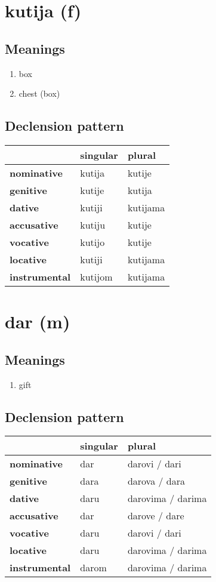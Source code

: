 \filbreak
\section{kutija (f)}
\subsection*{Meanings}
\begin{enumerate}
\item box
\item chest (box)
\end{enumerate}
\subsection*{Declension pattern}
\begin{tabularx}{\linewidth}{Xll}
\toprule
{} & singular &    plural \\
\midrule
\textbf{nominative  } &   kutija &    kutije \\
\textbf{genitive    } &   kutije &    kutija \\
\textbf{dative      } &   kutiji &  kutijama \\
\textbf{accusative  } &   kutiju &    kutije \\
\textbf{vocative    } &   kutijo &    kutije \\
\textbf{locative    } &   kutiji &  kutijama \\
\textbf{instrumental} &  kutijom &  kutijama \\
\bottomrule
\end{tabularx}

\filbreak
\section{dar (m)}
\subsection*{Meanings}
\begin{enumerate}
\item gift
\end{enumerate}
\subsection*{Declension pattern}
\begin{tabularx}{\linewidth}{Xll}
\toprule
{} & singular &             plural \\
\midrule
\textbf{nominative  } &      dar &      darovi / dari \\
\textbf{genitive    } &     dara &      darova / dara \\
\textbf{dative      } &     daru &  darovima / darima \\
\textbf{accusative  } &      dar &      darove / dare \\
\textbf{vocative    } &     daru &      darovi / dari \\
\textbf{locative    } &     daru &  darovima / darima \\
\textbf{instrumental} &    darom &  darovima / darima \\
\bottomrule
\end{tabularx}

